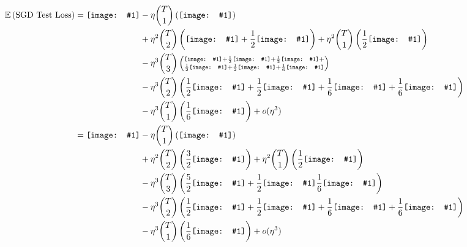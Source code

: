 \documentclass[12pt]{article}
\newcommand{\half}{\frac{1}{2}}
\newcommand{\sixth}{\frac{1}{6}}
\newcommand{\dia}[1]{\texttt{[image: \#1]}}
\begin{document}


    \begin{align*}
        \expec \wrap{\text{SGD Test Loss}} = \dia{sgd-0}
        &- \eta   {T \choose 1} \wrap{\dia{sgd-1}} \\
        &+ \eta^2 {T \choose 2} \wrap{\dia{sgd-2a} + \half \dia{sgd-2b}}
         + \eta^2 {T \choose 1} \wrap{\half \dia{sgd-2c}} \\
        &- \eta^3 {T \choose 3} \wrap{\substack{
            \dia{sgd-3a} + \half \dia{sgd-3b} + \half \dia{sgd-3c} + \\
             \half \dia{sgd-3d} + \half \dia{sgd-3e} + \sixth \dia{sgd-3f}}} \\
        &- \eta^3 {T \choose 2} \wrap{\half \dia{sgd-3g} + \half \dia{sgd-3h} + \sixth \dia{sgd-3i} + \sixth \dia{sgd-3j}} \\
        &- \eta^3 {T \choose 1} \wrap{\sixth \dia{sgd-3k}} 
         + o(\eta^3) \\
        = \dia{sgd-0}
        &- \eta   {T \choose 1} \wrap{\dia{sgd-1}} \\
        &+ \eta^2 {T \choose 2} \wrap{\frac{3}{2}\dia{sgd-2a}}
         + \eta^2 {T \choose 1} \wrap{\half \dia{sgd-2c}} \\
        &- \eta^3 {T \choose 3} \wrap{\frac{5}{2} \dia{sgd-3a} + \half \dia{sgd-3b} \sixth \dia{sgd-3f}} \\
        &- \eta^3 {T \choose 2} \wrap{\half \dia{sgd-3g} + \half \dia{sgd-3h} + \sixth \dia{sgd-3i} + \sixth \dia{sgd-3j}} \\
        &- \eta^3 {T \choose 1} \wrap{\sixth \dia{sgd-3k}} 
         + o(\eta^3)
    \end{align*}
\end{document}
